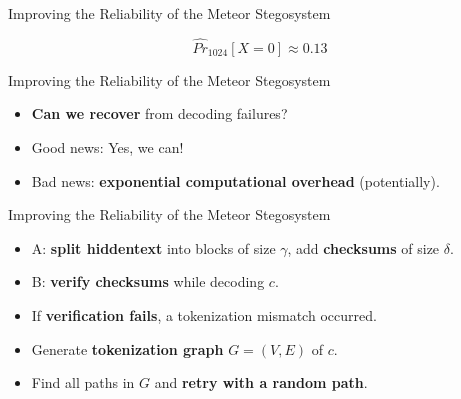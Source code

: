\documentclass[10pt]{beamer}
\begin{document}
\begin{frame}{Improving the Reliability of the Meteor Stegosystem}
	\centering
	
	$$\hat{Pr}_{1024}[X=0] \approx 0.13$$
\end{frame}

\begin{frame}{Improving the Reliability of the Meteor Stegosystem}
	\begin{itemize}[<+- | alert@+>]
		\item \textbf{Can we recover} from decoding failures? 
		\item Good news: Yes, we can!
		\item Bad news: \textbf{exponential computational overhead} (potentially).
	\end{itemize}
\end{frame}

\begin{frame}{Improving the Reliability of the Meteor Stegosystem}
	\begin{itemize}[<+- | alert@+>]
		\item A: \textbf{split hiddentext} into blocks of size $\gamma$, add \textbf{checksums} of size $\delta$.
		\item B: \textbf{verify checksums} while decoding $c$.
		\item If \textbf{verification fails}, a tokenization mismatch occurred.
		\item Generate \textbf{tokenization graph} $G=(V,E)$ of $c$.
		\item Find all paths in $G$ and \textbf{retry with a random path}.
	\end{itemize}
\end{frame}
	
\end{document}
